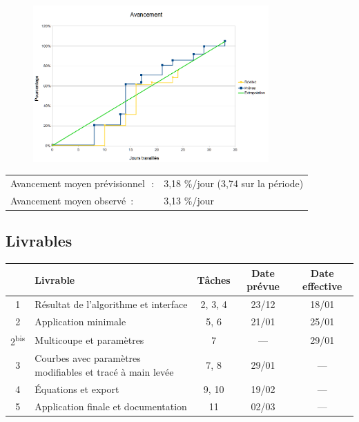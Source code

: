 \documentclass[xcolor=dvipsnames]{beamer}
\begin{document}
	\begin{frame}{\subsecname}
		\begin{figure}
			\includegraphics[height=6cm]{Images/Avancement2.png}
		\end{figure}
		\begin{tabular}{ll}
		Avancement moyen pr\'evisionnel\,\,\,\,: & 3,18 \%/jour (3,74 sur la p\'eriode)\\
		Avancement moyen observ\'e\,\,\,: & 3,13 \%/jour
		\end{tabular}
	\end{frame}


	\subsection{Livrables}
	\begin{frame}{\subsecname}
		\begin{center}
		\small
		\begin{tabular}{|c|>{\raggedright}m{3cm}|c|c|c|}
			\hline
			\textbf{\No} & \textbf{Livrable} & \textbf{T\^aches}
			& \textbf{Date pr\'evue} & \textbf{Date effective}\\
			\hline
			1 & R\'esultat de l'algorithme et interface & 2, 3, 4 & 23/12 
			& 18/01\\
			\hline
			2 & Application minimale & 5, 6 & 21/01 & 25/01\\
			\hline
			2\textsuperscript{bis} & Multicoupe et param\`etres & 7 & --- & 29/01\\
			\hline
			3 & Courbes avec param\`etres modifiables et trac\'e \`a main
			lev\'ee& 7, 8 & 29/01 & ---\\
			\hline
			4 & \'Equations et export & 9, 10 & 19/02 & ---\\
			\hline
			5 & Application finale et documentation & 11 & 02/03 & ---\\
			\hline
		\end{tabular}
		\end{center}
	\end{frame}
\end{document}
